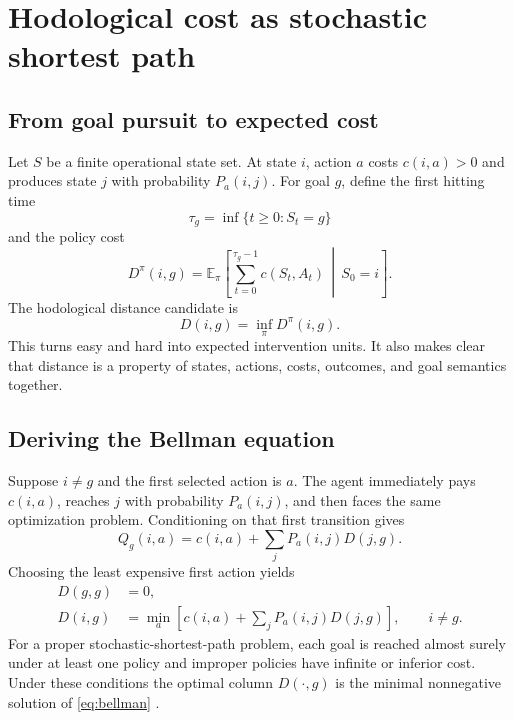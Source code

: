 \documentclass[11pt]{article}
\theoremstyle{definition}
\theoremstyle{remark}
\newcommand{\E}{\mathbb E}
\begin{document}
\section{Hodological cost as stochastic shortest path}
\label{sec:control}

\subsection{From goal pursuit to expected cost}

Let $S$ be a finite operational state set. At state $i$, action $a$ costs
$c(i,a)>0$ and produces state $j$ with probability $P_a(i,j)$. For goal
$g$, define the first hitting time
\begin{equation}
  \tau_g=\inf\{t\ge0:S_t=g\}
\end{equation}
and the policy cost
\begin{equation}
  D^\pi(i,g)=
  \E_\pi\left[
    \sum_{t=0}^{\tau_g-1}c(S_t,A_t)
    \,\middle|\,S_0=i
  \right].
  \label{eq:policy-cost}
\end{equation}
The hodological distance candidate is
\begin{equation}
  D(i,g)=\inf_\pi D^\pi(i,g).
  \label{eq:optimal-cost}
\end{equation}
This turns easy and hard into expected intervention units. It also makes
clear that distance is a property of states, actions, costs, outcomes, and
goal semantics together.

\subsection{Deriving the Bellman equation}

Suppose $i\ne g$ and the first selected action is $a$. The agent immediately
pays $c(i,a)$, reaches $j$ with probability $P_a(i,j)$, and then faces the
same optimization problem. Conditioning on that first transition gives
\begin{equation}
  Q_g(i,a)=c(i,a)+\sum_jP_a(i,j)D(j,g).
  \label{eq:action-cost}
\end{equation}
Choosing the least expensive first action yields
\begin{align}
  D(g,g)&=0,\label{eq:bellman-goal}\\
  D(i,g)&=\min_a\left[
    c(i,a)+\sum_jP_a(i,j)D(j,g)
  \right],\qquad i\ne g.
  \label{eq:bellman}
\end{align}
For a proper stochastic-shortest-path problem, each goal is reached almost
surely under at least one policy and improper policies have infinite or
inferior cost. Under these conditions the optimal column $D(\cdot,g)$ is the
minimal nonnegative solution of \cref{eq:bellman}
\cite{bellman1957,puterman1994,bertsekas1991}.
\end{document}
